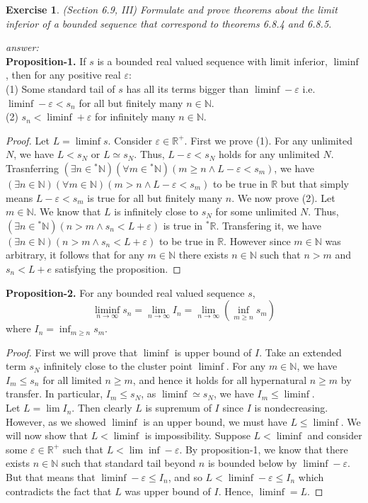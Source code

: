 \documentclass[a4paper, 11pt]{book}
\theoremstyle{plain}
\newtheorem{exercise}{Exercise}[chapter]
\newenvironment{answer}
    {\textit{answer:}}
    {}
\theoremstyle{plain}
\newcommand{\arr}{\rightarrow}
\newcommand{\N}{\mathbb{N}}
\newcommand{\R}{\mathbb{R}}
\newcommand{\ep}{\varepsilon}
\newcommand{\hyp}{{}^*}
\begin{document}
  \begin{exercise}
    (Section 6.9, III)
    Formulate and prove theorems about the limit inferior of a bounded sequence that correspond to theorems 6.8.4 and 6.8.5.
  \end{exercise} 
  \begin{answer} $ $ \\
    \textbf{Proposition-1.} If $s$ is a bounded real valued sequence with limit inferior, $\liminf$, then for any positive real $\ep$: \\
    (1) Some standard tail of $s$ has all its terms bigger than $\liminf-\ep$ i.e. $\liminf-\ep<s_n$ for all but finitely many $n \in \N$. \\
    (2) $s_n<\liminf +\ep$ for infinitely many $n \in \N$.
    \begin{proof}
      Let $L=\liminf s$. Consider $\ep \in \R^+$. First we prove (1). For any unlimited $N$, we have $L<s_N$ or $L \simeq s_N$. Thus, $L-\ep<s_N$ holds for any unlimited $N$. Trasnferring $(\exists n \in \hyp \N)(\forall m \in \hyp \N)(m \geq n \land L-\ep<s_m)$, we have $(\exists n \in \N)(\forall m \in \N)(m>n \land L-\ep<s_m)$ to be true in $\R$ but that simply means $L-\ep<s_m$ is true for all but finitely many $n$. We now prove (2). Let $m \in \N$. We know that $L$ is infinitely close to $s_N$ for some unlimited $N$. Thus, $(\exists n \in \hyp \N)(n>m \land s_n<L+\ep)$ is true in $\hyp \R$. Transfering it, we have $(\exists n \in \N)(n>m \land s_n<L+\ep)$ to be true in $\R$. However since $m \in \N$ was arbitrary, it follows that for any $m \in \N$ there exists $n \in \N$ such that $n>m$ and $s_n<L+e$ satisfying the proposition.
    \end{proof}
    \textbf{Proposition-2.} For any bounded real valued sequence $s$, $$\liminf_{n \arr \infty} s_n=\lim_{n \arr \infty} I_n=\lim_{n \arr \infty} \left(\inf_{m \geq n} s_m \right)$$ where $I_n=\inf_{m \geq n} s_m$.
    \begin{proof}
      First we will prove that $\liminf$ is upper bound of $I$. Take an extended term $s_N$ infinitely close to the cluster point $\liminf$. For any $m \in \N$, we have $I_m \leq s_n$ for all limited $n \geq m$, and hence it holds for all hypernatural $n \geq m$ by transfer. In particular, $I_m \leq s_N$, as $\liminf \simeq s_N$, we have $I_m \leq \liminf$. \\
      Let $L=\lim I_n$. Then clearly $L$ is supremum of $I$ since $I$ is nondecreasing. However, as we showed $\liminf$ is an upper bound, we must have $L \leq \liminf$. We will now show that $L< \liminf$ is impossibility. Suppose $L< \liminf$ and consider some $\ep \in \R^+$ such that $L<\lim\inf-\ep$. By proposition-1, we know that there exists $n \in \N$ such that standard tail beyond $n$ is bounded below by $\liminf-\ep$. But that means that $\liminf-\ep \leq I_n$, and so $L<\liminf-\ep\leq I_n$ which contradicts the fact that $L$ was upper bound of $I$. Hence, $\liminf=L$.
    \end{proof}
  \end{answer}
\end{document}

